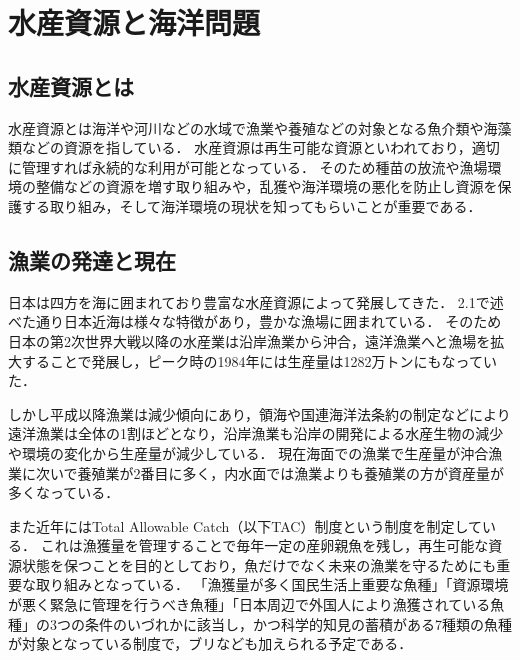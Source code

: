 \documentclass[12pt,a4j,titlepage]{ltjsarticle}
\begin{document}
\clearpage

\section{水産資源と海洋問題}\label{水産資源と海洋問題}

\subsection{水産資源とは}
水産資源とは海洋や河川などの水域で漁業や養殖などの対象となる魚介類や海藻類などの資源を指している．
水産資源は再生可能な資源といわれており，適切に管理すれば永続的な利用が可能となっている\cite{suisanntyou}．
そのため種苗の放流や漁場環境の整備などの資源を増す取り組みや，乱獲や海洋環境の悪化を防止し資源を保護する取り組み，そして海洋環境の現状を知ってもらいことが重要である．
\subsection{漁業の発達と現在}
日本は四方を海に囲まれており豊富な水産資源によって発展してきた．
2.1で述べた通り日本近海は様々な特徴があり，豊かな漁場に囲まれている．
そのため日本の第2次世界大戦以降の水産業は沿岸漁業から沖合，遠洋漁業へと漁場を拡大することで発展し，ピーク時の1984年には生産量は1282万トンにもなっていた．\par
しかし平成以降漁業は減少傾向にあり，領海や国連海洋法条約の制定などにより遠洋漁業は全体の1割ほどとなり，沿岸漁業も沿岸の開発による水産生物の減少や環境の変化から生産量が減少している．
現在海面での漁業で生産量が沖合漁業に次いで養殖業が2番目に多く，内水面では漁業よりも養殖業の方が資産量が多くなっている．\par
また近年にはTotal Allowable Catch（以下TAC）制度という制度を制定している．
これは漁獲量を管理することで毎年一定の産卵親魚を残し，再生可能な資源状態を保つことを目的としており，魚だけでなく未来の漁業を守るためにも重要な取り組みとなっている\cite{TAC}．
「漁獲量が多く国民生活上重要な魚種」「資源環境が悪く緊急に管理を行うべき魚種」「日本周辺で外国人により漁獲されている魚種」の3つの条件のいづれかに該当し，かつ科学的知見の蓄積がある7種類の魚種が対象となっている制度で，ブリなども加えられる予定である．\par
\end{document}
